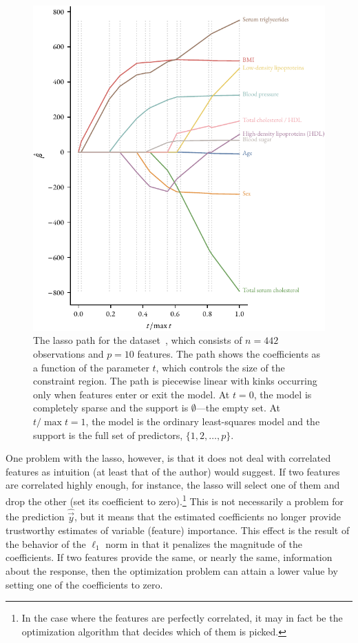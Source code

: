 \begin{figure}
  \centering
  \includegraphics[]{figures/lasso-path.pdf}
  \caption{%
    The lasso path for the  dataset~\parencite{efron2004}, which consists of \(n=442\) observations and \(p=10\) features. The path shows the coefficients as a function of the parameter \(t\), which controls the size of the constraint region. The path is piecewise linear with kinks occurring only when features enter or exit the model.
    At \(t = 0\), the model is completely sparse and the support is \(\emptyset\)---the empty set. At \(t/\max t = 1\), the model is the ordinary least-squares model and the support is the full set of predictors, \(\{1,2,\dots,p\}\).
  }
  \label{fig:lasso-path}
\end{figure}

One problem with the lasso, however, is that it does not deal with correlated features as intuition (at least that of the author) would suggest. If two features are correlated highly enough, for instance, the lasso will select one of them and drop the other (set its coefficient to zero).\footnote{In the case where the features are perfectly correlated, it may in fact be the optimization algorithm that decides which of them is picked.} This is not necessarily a problem for the prediction \(\hat{\vec{y}}\), but it means that the estimated coefficients no longer provide trustworthy estimates of variable (feature) importance. This effect is the result of the behavior of the \(\ell_1\) norm in that it penalizes the magnitude of the coefficients. If two features provide the same, or nearly the same, information about the response, then the optimization problem can attain a lower value by setting one of the coefficients to zero.

